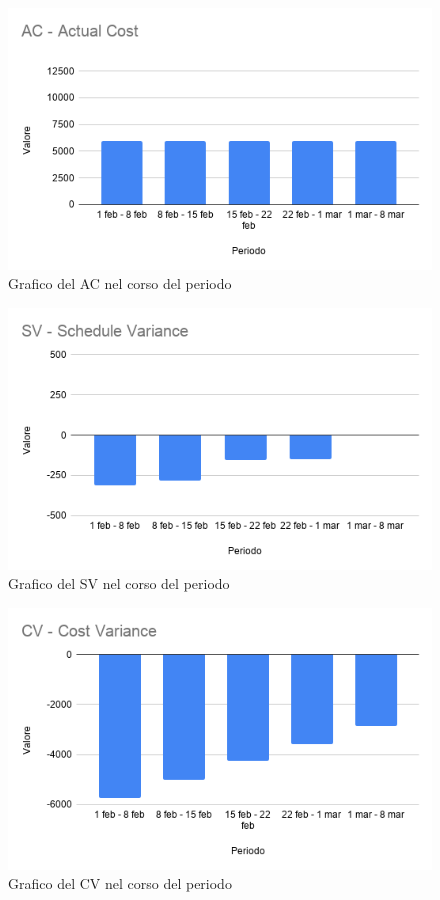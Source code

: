 \begin{figure}[H]
	\centering
	\includegraphics[width=0.7\linewidth]{res/images/AC.png}
	\caption{Grafico del AC nel corso del periodo}
	\label{fig:Figura4}
\end{figure}

\begin{figure}[H]
	\centering
	\includegraphics[width=0.7\linewidth]{res/images/SV.png}
	\caption{Grafico del SV nel corso del periodo}
	\label{fig:Figura5}
\end{figure}

\begin{figure}[H]
	\centering
	\includegraphics[width=0.7\linewidth]{res/images/CV.png}
	\caption{Grafico del CV nel corso del periodo}
	\label{fig:Figura6}
\end{figure}
